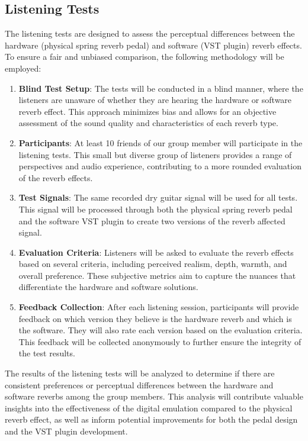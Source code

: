 \documentclass[12pt]{article}
\begin{document}
\subsection{Listening Tests}
The listening tests are designed to assess the perceptual differences between the hardware (physical spring reverb pedal) and software (VST plugin) reverb effects. To ensure a fair and unbiased comparison, the following methodology will be employed:

\begin{enumerate}
    \item \textbf{Blind Test Setup}: The tests will be conducted in a blind manner, where the listeners are unaware of whether they are hearing the hardware or software reverb effect. This approach minimizes bias and allows for an objective assessment of the sound quality and characteristics of each reverb type.
    
    \item \textbf{Participants}: At least 10 friends of our group member will participate in the listening tests. This small but diverse group of listeners provides a range of perspectives and audio experience, contributing to a more rounded evaluation of the reverb effects.
    
    \item \textbf{Test Signals}: The same recorded dry guitar signal will be used for all tests. This signal will be processed through both the physical spring reverb pedal and the software VST plugin to create two versions of the reverb affected signal.
    
    \item \textbf{Evaluation Criteria}: Listeners will be asked to evaluate the reverb effects based on several criteria, including perceived realism, depth, warmth, and overall preference. These subjective metrics aim to capture the nuances that differentiate the hardware and software solutions.
    
    \item \textbf{Feedback Collection}: After each listening session, participants will provide feedback on which version they believe is the hardware reverb and which is the software. They will also rate each version based on the evaluation criteria. This feedback will be collected anonymously to further ensure the integrity of the test results.
\end{enumerate}

The results of the listening tests will be analyzed to determine if there are consistent preferences or perceptual differences between the hardware and software reverbs among the group members. This analysis will contribute valuable insights into the effectiveness of the digital emulation compared to the physical reverb effect, as well as inform potential improvements for both the pedal design and the VST plugin development.
\end{document}
